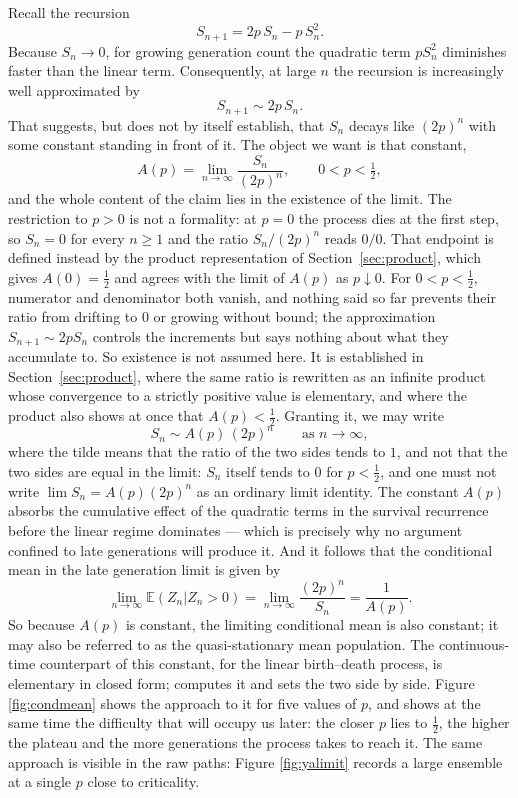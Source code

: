 Recall the recursion
\[
S_{n+1} = 2p\, S_n - p\, S_n^2.
\]
Because $S_n \to 0$, for growing generation count the quadratic term $p S_n^2$ diminishes faster than the
linear term. Consequently, at large $n$ the recursion is increasingly well approximated by
\[
S_{n+1} \sim 2p\, S_n.
\]
That suggests, but does not by itself establish, that $S_n$ decays like $(2p)^n$ with some constant standing in front of it. The object we want is that constant,
\begin{equation}
\label{eq:Ap-def-main}
 A(p) = \lim_{n \to \infty} \frac{S_n}{(2p)^n},
 \qquad 0<p<\tfrac12,
\end{equation}
and the whole content of the claim lies in the existence of the limit. The restriction to $p>0$ is not a formality: at $p=0$ the process dies at the first step, so $S_n=0$ for every $n\ge1$ and the ratio $S_n/(2p)^n$ reads $0/0$. That endpoint is defined instead by the product representation of Section~\ref{sec:product}, which gives $A(0)=\tfrac12$ and agrees with the limit of $A(p)$ as $p\downarrow0$. For $0<p<\tfrac12$, numerator and denominator both vanish, and nothing said so far prevents their ratio from drifting to $0$ or growing without bound; the approximation $S_{n+1}\sim 2p S_n$ controls the increments but says nothing about what they accumulate to. So existence is not assumed here. It is established in Section~\ref{sec:product}, where the same ratio is rewritten as an infinite product whose convergence to a strictly positive value is elementary, and where the product also shows at once that $A(p)<\tfrac12$. Granting it, we may write
\begin{equation}
\label{eq:Sn-asymp}
S_n \sim A(p)\,(2p)^n
\qquad\text{as }n\to\infty,
\end{equation}
where the tilde means that the ratio of the two sides tends to $1$, and not that the two sides are equal in the limit: $S_n$ itself tends to $0$ for $p<\tfrac12$, and one must not write $\lim S_n = A(p)(2p)^n$ as an ordinary limit identity.
The constant $A(p)$ absorbs the cumulative effect of the quadratic terms in the survival recurrence before the linear regime dominates --- which is precisely why no argument confined to late generations will produce it.
And it follows that the conditional mean in the late generation limit is given by
\[
 \lim_{n\to\infty} \mathbb{E}(Z_n | Z_n > 0) = \lim_{n \to \infty} \frac{(2p)^n}{S_n} = \frac{1}{A(p)}.
\]
So because $A(p)$ is constant, the limiting conditional mean is also constant; it may also be referred to as the quasi-stationary mean population. The continuous-time counterpart of this constant, for the linear birth--death process, is elementary in closed form; \ChM{} computes it and sets the two side by side. Figure \ref{fig:condmean} shows the approach to it for five values of $p$, and shows at the same time the difficulty that will occupy us later: the closer $p$ lies to $\tfrac12$, the higher the plateau and the more generations the process takes to reach it. The same approach is visible in the raw paths: Figure \ref{fig:yalimit} records a large ensemble at a single $p$ close to criticality.

